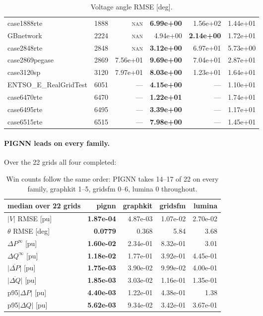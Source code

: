 \documentclass[10pt]{article}
\begin{document}
\begin{table}[H]
\begin{tabular}{lr rrrr}
case1888rte & 1888 & \textsc{nan} & \textbf{6.99e+00} & 1.56e+02 & 1.44e+01 \\
GBnetwork & 2224 & \textsc{nan} & 4.94e+00 & \textbf{2.14e+00} & 1.72e+01 \\
case2848rte & 2848 & \textsc{nan} & \textbf{3.12e+00} & 6.97e+01 & 5.73e+00 \\
case2869pegase & 2869 & 7.56e+01 & \textbf{9.69e+00} & 7.04e+01 & 2.87e+01 \\
case3120sp & 3120 & 7.97e+01 & \textbf{8.03e+00} & 1.23e+01 & 1.64e+01 \\
ENTSO\_E\_RealGridTest & 6051 & --- & \textbf{4.15e+00} & --- & 1.10e+01 \\
case6470rte & 6470 & --- & \textbf{1.22e+01} & --- & 1.74e+01 \\
case6495rte & 6495 & --- & \textbf{3.39e+00} & --- & 1.17e+01 \\
case6515rte & 6515 & --- & \textbf{7.98e+00} & --- & 1.45e+01 \\
\bottomrule
\end{tabular}
\caption{Voltage angle RMSE [deg].}
\end{table}

\paragraph{PIGNN leads on every family.} Over the 22 grids all four completed:

\begin{table}[H]
\centering\small
\begin{tabular}{lrrrr}
\toprule
median over 22 grids & pignn & graphkit & gridsfm & lumina \\
\midrule
$|V|$ RMSE [pu]              & \textbf{1.87e-04} & 4.87e-03 & 1.07e-02 & 2.70e-02 \\
$\theta$ RMSE [deg]          & \textbf{0.0779}   & 0.368    & 5.84     & 3.68 \\
$\Delta P^{\infty}$ [pu]     & \textbf{1.60e-02} & 2.34e-01 & 8.32e-01 & 3.01 \\
$\Delta Q^{\infty}$ [pu]     & \textbf{1.18e-02} & 1.77e-01 & 3.92e-01 & 4.45e-01 \\
$\overline{|\Delta P|}$ [pu] & \textbf{1.75e-03} & 3.90e-02 & 9.99e-02 & 4.00e-01 \\
$\overline{|\Delta Q|}$ [pu] & \textbf{1.85e-03} & 3.03e-02 & 1.16e-01 & 1.35e-01 \\
p95$|\Delta P|$ [pu]         & \textbf{4.40e-03} & 1.22e-01 & 4.38e-01 & 1.38 \\
p95$|\Delta Q|$ [pu]         & \textbf{5.62e-03} & 9.34e-02 & 3.42e-01 & 3.67e-01 \\
\bottomrule
\end{tabular}
\caption{Win counts follow the same order: PIGNN takes 14--17 of 22 on every
family, graphkit 1--5, gridsfm 0--6, lumina 0 throughout.}
\end{table}
\end{document}
